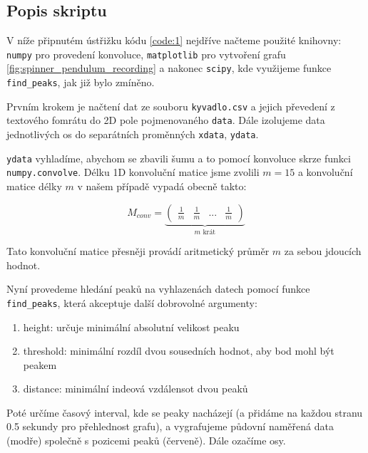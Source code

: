 \documentclass[12pt, a4paper,
 twoside,        %
 openright
]{report}
\begin{document}
\subsection{Popis skriptu}

V níže připnutém ústřižku kódu \ref{code:1} nejdříve načteme použité knihovny:
\texttt{numpy} \cite{numpy} pro provedení konvoluce,
\texttt{matplotlib} pro vytvoření grafu \ref{fig:spinner_pendulum_recording} \cite{matplotlib} a nakonec
\texttt{scipy}, kde využijeme funkce \texttt{find\_peaks}, jak již bylo zmíněno.

Prvním krokem je načtení dat ze souboru \texttt{kyvadlo.csv} a jejich převedení z textového fomrátu do 2D pole pojmenovaného \texttt{data}.
Dále izolujeme data jednotlivých os do separátních proměnných \texttt{xdata}, \texttt{ydata}.

\texttt{ydata} vyhladíme, abychom se zbavili šumu a to pomocí konvoluce skrze funkci \texttt{numpy.convolve}.
Délku 1D konvoluční matice jsme zvolili $m = 15$ a konvoluční matice délky $m$ v našem případě vypadá obecně takto:

\begin{equation}
    \label{eq:conv_matrix_avg}
    M_{conv} =
    \underbrace{
        \begin{pmatrix}
            \frac{1}{m} & \frac{1}{m} & ... & \frac{1}{m}
        \end{pmatrix}
    }_{m\text{ krát}}
\end{equation}

Tato konvoluční matice přesněji provádí aritmetický průměr $m$ za sebou jdoucích hodnot.

Nyní provedeme hledání peaků na vyhlazenách datech pomocí funkce \texttt{find\_peaks}, která akceptuje další dobrovolné argumenty:
\begin{enumerate}[topsep=0pt, partopsep=0pt]
    \setlength{\itemsep}{0pt}%
    \setlength{\parskip}{0pt}%
    \item height: určuje minimální absolutní velikost peaku
    \item threshold: minimální rozdíl dvou sousedních hodnot, aby bod mohl být peakem
    \item distance: minimální indeová vzdálensot dvou peaků
\end{enumerate}

Poté určíme časový interval, kde se peaky nacházejí (a přidáme na každou stranu 0.5 sekundy pro přehlednost grafu),
a vygrafujeme půdovní naměřená data (modře) společně s pozicemi peaků (červeně). Dále ozačíme osy.
\end{document}
